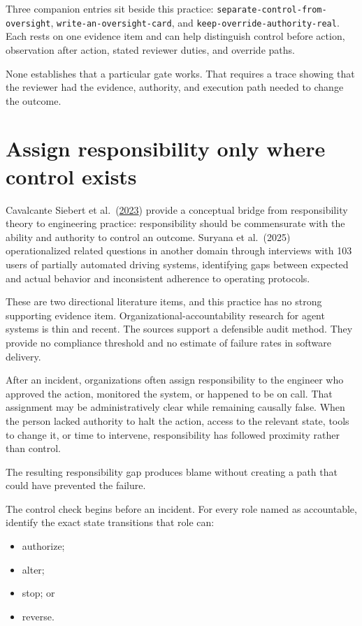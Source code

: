 Three companion entries sit beside this practice: \texttt{separate-control-from-oversight}, \texttt{write-an-oversight-card}, and \texttt{keep-override-authority-real}. Each rests on one evidence item and can help distinguish control before action, observation after action, stated reviewer duties, and override paths.

None establishes that a particular gate works. That requires a trace showing that the reviewer had the evidence, authority, and execution path needed to change the outcome.

\section{Assign responsibility only where control exists}\label{assign-responsibility-only-where-control-exists}

Cavalcante Siebert et al.~(\href{https://arxiv.org/abs/2112.01298}{2023}) provide a conceptual bridge from responsibility theory to engineering practice: responsibility should be commensurate with the ability and authority to control an outcome. Suryana et al.~(2025) operationalized related questions in another domain through interviews with 103 users of partially automated driving systems, identifying gaps between expected and actual behavior and inconsistent adherence to operating protocols.

These are two directional literature items, and this practice has no strong supporting evidence item. Organizational-accountability research for agent systems is thin and recent. The sources support a defensible audit method. They provide no compliance threshold and no estimate of failure rates in software delivery.

After an incident, organizations often assign responsibility to the engineer who approved the action, monitored the system, or happened to be on call. That assignment may be administratively clear while remaining causally false. When the person lacked authority to halt the action, access to the relevant state, tools to change it, or time to intervene, responsibility has followed proximity rather than control.

The resulting responsibility gap produces blame without creating a path that could have prevented the failure.

The control check begins before an incident. For every role named as accountable, identify the exact state transitions that role can:

\begin{itemize}
\tightlist
\item
  authorize;
\item
  alter;
\item
  stop; or
\item
  reverse.
\end{itemize}

